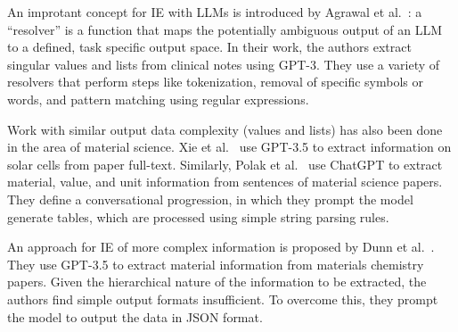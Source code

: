 An improtant concept for IE with LLMs is introduced by Agrawal et al.~\cite{Agrawal2022}: a ``resolver'' is a function that maps the potentially ambiguous output of an LLM to a defined, task specific output space. In their work, the authors extract singular values and lists from clinical notes using GPT-3. They use a variety of resolvers that perform steps like tokenization, removal of specific symbols or words, and pattern matching using regular expressions.

Work with similar output data complexity (values and lists) has also been done in the area of material science. Xie et al.~\cite{Xie2023} use GPT-3.5 to extract information on solar cells from paper full-text.
Similarly, Polak et al.~\cite{Polak2023} use ChatGPT %
to extract material, value, and unit information from sentences of material science papers. They define a conversational progression, in which they prompt the model generate tables, which are processed using simple string parsing rules.

An approach for IE of more complex information is proposed by Dunn et al.~\cite{Dunn2022}. They use GPT-3.5 to extract material information from materials chemistry papers. Given the hierarchical nature of the information to be extracted, the authors find simple output formats insufficient. To overcome this, they prompt the model to output the data in JSON format.%

